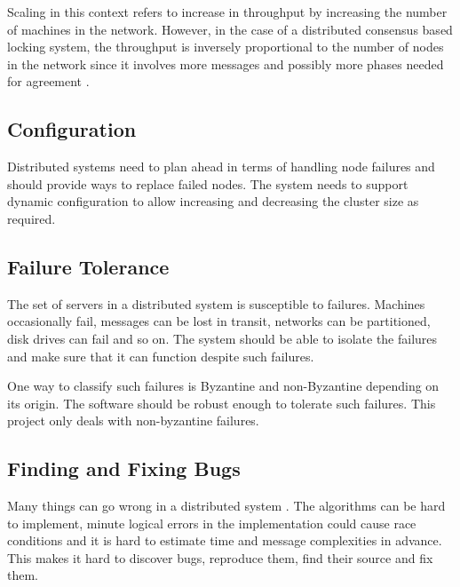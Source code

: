 Scaling in this context refers to increase in throughput by increasing the
number of machines in the network. However, in the case of a distributed
consensus based locking system, the throughput is inversely proportional to the
number of nodes in the network since it involves more messages and possibly
more phases needed for agreement%
.

\subsection{Configuration}

Distributed systems need to plan ahead in terms of handling node failures and
should provide ways to replace failed nodes. The system needs to support dynamic
configuration to allow increasing and decreasing the cluster size as required.

\subsection{Failure Tolerance}

The set of servers in a distributed system is susceptible to failures.
Machines occasionally fail, messages can be lost in transit, networks can be
partitioned, disk drives can fail and so on. The system should be able to
isolate the failures and make sure that it can function despite such failures.

One way to classify such failures is Byzantine%
and non-Byzantine%
depending on its origin. The software should be robust enough to tolerate such
failures. This project only deals with non-byzantine failures.

\subsection{Finding and Fixing Bugs}

Many things can go wrong in a distributed system
\citep{Rotem-gal-oz_fallaciesof}. The algorithms can be hard to implement,
minute logical errors in the implementation could cause race conditions and
it is hard to estimate time and message complexities in advance. This makes it
hard to discover bugs, reproduce them, find their source and fix them.

